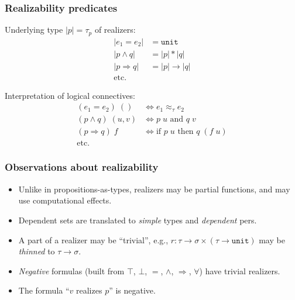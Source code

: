 \documentclass[compress,t]{beamer}
\newcommand{\per}{\approx}
\newcommand{\typeOf}[1]{|#1|}
\begin{document}
\begin{frame}
  \frametitle{Realizability predicates}

  Underlying type $\typeOf{p} = \tau_p$ of realizers:
  \begin{align*}
    \typeOf{e_1 = e_2} &= \mathtt{unit} \\
    \typeOf{p \land q} &= \typeOf{p} * \typeOf{q} \\
    \typeOf{p \Rightarrow q} &= \typeOf{p} \to \typeOf{q} \\
    \text{etc.}
  \end{align*}

  Interpretation of logical connectives:
  \begin{align*}
    (e_1 = e_2)\; ()     &\iff \text{$e_1 \per_\tau e_2$} \\
    (p \land q)\; (u, v) &\iff \text{$p\; u$ and $q\; v$} \\
    (p \Rightarrow q)\; f  &\iff \text{if $p\; u$ then $q\; (f\; u)$}\\
    \text{etc.}
  \end{align*}
\end{frame}

\begin{frame}
  \frametitle{Observations about realizability}

  \begin{itemize}
  \item<1-> Unlike in propositions-as-types, realizers may be partial
    functions, and may use computational effects.
  \item<2-> Dependent sets are translated to \emph{simple} types and
    \emph{dependent} pers.
  \item<3-> A part of a realizer may be ``trivial'', e.g., $r : \tau \to
    \sigma \times (\tau \to \mathtt{unit})$ may be \emph{thinned} to
    $\tau \to \sigma$.
  \item<4-> \emph{Negative} formulas (built from $\top$, $\bot$, $=$,
    $\land$, $\Rightarrow$, $\forall$) have trivial realizers.
  \item<5-> The formula ``$v$ realizes $p$'' is negative.
  \end{itemize}

\end{frame}
\end{document}
